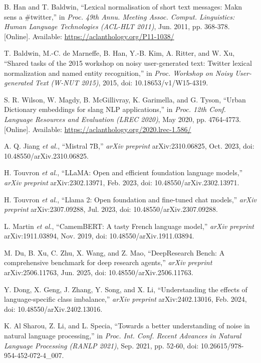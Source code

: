 \documentclass[12pt]{article}
\begin{document}
\begin{thebibliography}{99}
B. Han and T. Baldwin, ``Lexical normalisation of short text messages: Makn sens a \#twitter,'' in \textit{Proc. 49th Annu. Meeting Assoc. Comput. Linguistics: Human Language Technologies (ACL-HLT 2011)}, Jun. 2011, pp. 368-378. [Online]. Available: \url{https://aclanthology.org/P11-1038/}

T. Baldwin, M.-C. de Marneffe, B. Han, Y.-B. Kim, A. Ritter, and W. Xu, ``Shared tasks of the 2015 workshop on noisy user-generated text: Twitter lexical normalization and named entity recognition,'' in \textit{Proc. Workshop on Noisy User-generated Text (W-NUT 2015)}, 2015, doi: 10.18653/v1/W15-4319.

S. R. Wilson, W. Magdy, B. McGillivray, K. Garimella, and G. Tyson, ``Urban Dictionary embeddings for slang NLP applications,'' in \textit{Proc. 12th Conf. Language Resources and Evaluation (LREC 2020)}, May 2020, pp. 4764-4773. [Online]. Available: \url{https://aclanthology.org/2020.lrec-1.586/}

A. Q. Jiang \textit{et al.}, ``Mistral 7B,'' \textit{arXiv preprint} arXiv:2310.06825, Oct. 2023, doi: 10.48550/arXiv.2310.06825.

H. Touvron \textit{et al.}, ``LLaMA: Open and efficient foundation language models,'' \textit{arXiv preprint} arXiv:2302.13971, Feb. 2023, doi: 10.48550/arXiv.2302.13971.

H. Touvron \textit{et al.}, ``Llama 2: Open foundation and fine-tuned chat models,'' \textit{arXiv preprint} arXiv:2307.09288, Jul. 2023, doi: 10.48550/arXiv.2307.09288.

L. Martin \textit{et al.}, ``CamemBERT: A tasty French language model,'' \textit{arXiv preprint} arXiv:1911.03894, Nov. 2019, doi: 10.48550/arXiv.1911.03894.

M. Du, B. Xu, C. Zhu, X. Wang, and Z. Mao, ``DeepResearch Bench: A comprehensive benchmark for deep research agents,'' \textit{arXiv preprint} arXiv:2506.11763, Jun. 2025, doi: 10.48550/arXiv.2506.11763.

Y. Dong, X. Geng, J. Zhang, Y. Song, and X. Li, ``Understanding the effects of language-specific class imbalance,'' \textit{arXiv preprint} arXiv:2402.13016, Feb. 2024, doi: 10.48550/arXiv.2402.13016.

K. Al Sharou, Z. Li, and L. Specia, ``Towards a better understanding of noise in natural language processing,'' in \textit{Proc. Int. Conf. Recent Advances in Natural Language Processing (RANLP 2021)}, Sep. 2021, pp. 52-60, doi: 10.26615/978-954-452-072-4\_007.


\end{thebibliography}
\end{document}
